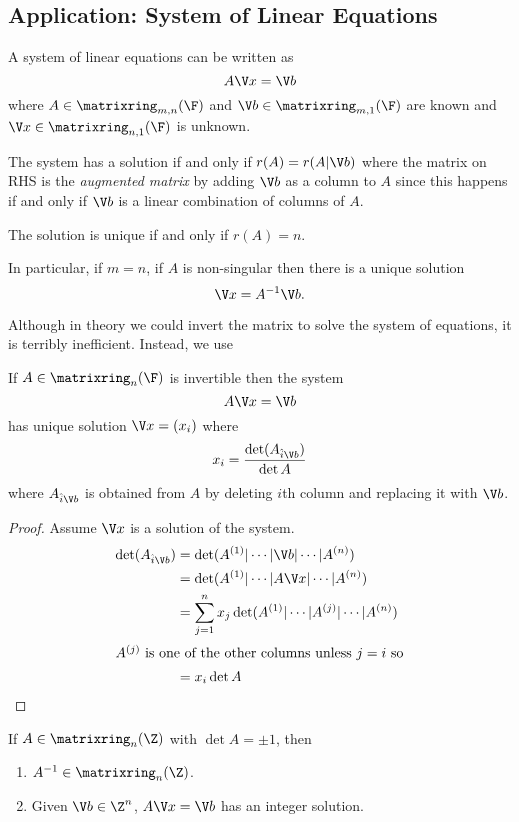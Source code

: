 \documentclass[a4paper]{article}
\newcommand*{\M}{\matrixring}
\theoremstyle{definition}
\begin{document}
\subsection{Application: System of Linear Equations}

A system of linear equations can be written as
\[
  A \V x = \V b
\]
where \(A \in \M_{m, n}(\F)\) and \(\V b \in \M_{m, 1}(\F)\) are known and \(\V x \in \M_{n, 1}(\F)\) is unknown.

The system has a solution if and only if \(r(A) = r(A|\V b)\) where the matrix on RHS is the \emph{augmented matrix} by adding \(\V b\) as a column to \(A\) since this happens if and only if \(\V b\) is a linear combination of columns of \(A\).

The solution is unique if and only if \(r(A) = n\).

In particular, if \(m = n\), if \(A\) is non-singular then there is a unique solution
\[
  \V x = A^{-1} \V b.
\]

Although in theory we could invert the matrix to solve the system of equations, it is terribly inefficient. Instead, we use

\begin{proposition}
  If \(A \in \M_n(\F)\) is invertible then the system
  \[
    A \V x = \V b
  \]
  has unique solution \(\V x = (x_i)\) where
  \[
    x_i = \frac{\det (A_{\hat{i} \V b})}{\det A}
  \]
  where \(A_{\hat{i} \V b}\) is obtained from \(A\) by deleting \(i\)th column and replacing it with \(\V b\).
\end{proposition}

\begin{proof}
  Assume \(\V x\) is a solution of the system.
  \begin{align*}
    \det (A_{\hat i \V b}) &= \det(A^{(1)} | \cdots | \V b | \cdots | A^{(n)}) \\
                           &= \det(A^{(1)} | \cdots | A \V x | \cdots | A^{(n)}) \\
                           &= \sum_{j = 1}^{n} x_j \det(A^{(1)} | \cdots | A^{(j)} | \cdots | A^{(n)}) \\
    \intertext{\(A^{(j)}\) is one of the other columns unless \(j = i\) so}
                           &= x_i \det A
  \end{align*}
\end{proof}

\begin{corollary}
  If \(A \in \M_n(\Z)\) with \(\det A = \pm 1\), then
  \begin{enumerate}
  \item \(A^{-1} \in \M_n(\Z)\).
  \item Given \(\V b \in \Z^n\), \(A \V x = \V b\) has an integer solution.
  \end{enumerate}
\end{corollary}
\end{document}
